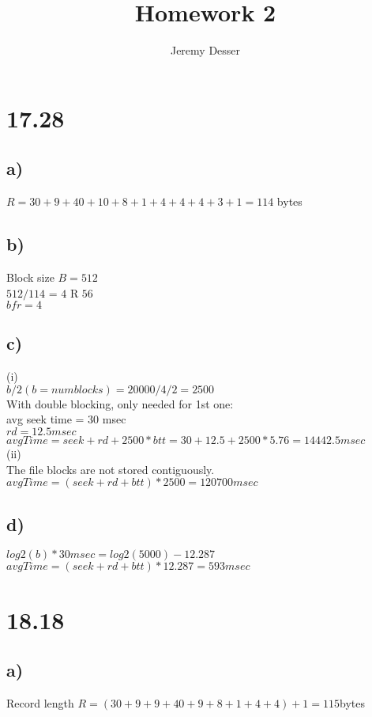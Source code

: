\documentclass[11pt]{article}
\theoremstyle{plain}
\theoremstyle{definition}
\begin{document}
 


\title{Homework 2}
\author{Jeremy Desser}
\begin{titlepage}
\maketitle
\end{titlepage}


\section*{17.28}
\subsection*{a)}
$R = 30+9+40+10+8+1+4+4+4+3+1 = 114$ bytes
\subsection*{b)}
Block size $B = 512$ \\
   $ 512/114$ = $4$ R $56$ \\
   $ bfr = 4$
\subsection*{c)}
 (i) \\
       $ b/2  (b = num blocks) = 20000/4/2 = 2500$\\
        With double blocking, only needed for 1st one:\\
         avg seek time = 30 msec\\
       
        $ rd = 12.5 msec$ \\

        $avgTime=seek+rd+2500*btt=30+12.5+2500*5.76=14442.5 msec$\\
(ii)\\
	    The file blocks are not stored contiguously.\\
        $avgTime=(seek+rd+btt)*2500=120700 msec$
\subsection*{d)}
$log2(b)*30msec = log2(5000)-12.287$\\
    $avgTime=(seek+rd+btt)*12.287=593 msec$
\section*{18.18 } 
\subsection*{a)}
Record length $R = (30 + 9 + 9 + 40 + 9 + 8 + 1 + 4 + 4) + 1 = 115 $bytes
\end{document}
